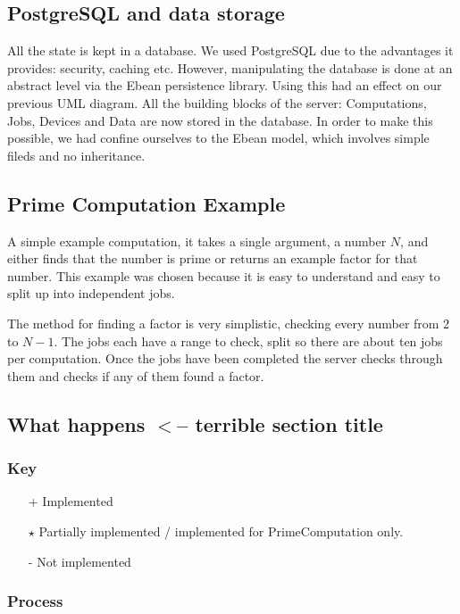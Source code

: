 \documentclass[a4paper,10pt]{article}
\begin{document}
\subsection{PostgreSQL and data storage}
All the state is kept in a database. We used PostgreSQL due to the advantages it provides: security, caching etc. However, manipulating the database is done at an abstract level via the Ebean persistence library. Using this had an effect on our previous UML diagram. All the building blocks of the server: Computations, Jobs, Devices and Data are now stored in the database. In order to make this possible, we had confine ourselves to the Ebean model, which involves simple fileds and no inheritance. 
\subsection{Prime Computation Example}

A simple example computation, it takes a single argument, a number $N$, and either finds that the number is prime or returns an example factor for that number.
This example was chosen because it is easy to understand and easy to split up into independent jobs.

The method for finding a factor is very simplistic, checking every number from 2 to $N-1$. The jobs each have a range to check, split so there are about ten jobs per computation.
Once the jobs have been completed the server checks through them and checks if any of them found a factor.
\subsection{What happens $<$-- terrible section title}

\subsubsection{Key}
\begin{itemize}
\item[+] Implemented
\item[$\star$] Partially implemented / implemented for PrimeComputation only.
\item[-] Not implemented
\end{itemize}

\subsubsection{Process}
\end{document}
